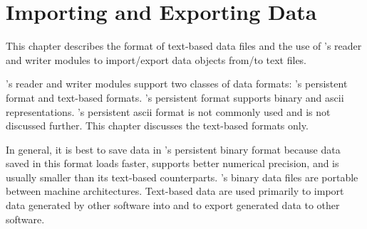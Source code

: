 %
% 
% 
% 
% 
% 
%


\chapter{Importing and Exporting \sr{} Data}
\label{ch:import_export} 

This chapter describes the format of text-based data files and the use
of \sr{}'s reader and writer modules to import/export \sr{} data
objects from/to text files. 

\sr{}'s reader and writer modules support two classes of data formats:
\sr{}'s persistent format and text-based formats.  \sr{}'s persistent
format supports binary and ascii representations.  \sr{}'s persistent
ascii format is not commonly used and is not discussed further.  This
chapter discusses the text-based formats only.

In general, it is best to save data in \sr{}'s persistent binary
format because data saved in this format loads faster, supports better
numerical precision, and is usually smaller than its text-based
counterparts.  \sr{}'s binary data files are portable between machine
architectures.  Text-based data are used primarily to import data
generated by other software into \sr{} and to export \sr{} generated
data to other software.

